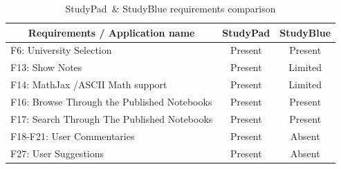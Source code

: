 \documentclass[thesis=B,english]{FITthesis}[2012/10/20]
\newcommand{\appname}{StudyPad}
\begin{document}
\begin{table}[H]
\caption{\appname\ \& StudyBlue requirements comparison}
\label{tab:studyblue}
\begin{tabular}{|l|c|c|}
\hline
\multicolumn{1}{|c|}{\textbf{Requirements / Application name}} & \multicolumn{1}{l|}{\textbf{StudyPad}} & \multicolumn{1}{l|}{\textbf{StudyBlue}} \\ \hline
F6: University Selection                                       & Present                                & Present                                \\ \hline
F13: Show Notes                                                & Present                                & Limited                                \\ \hline
F14: MathJax /ASCII Math support                               & Present                                & Limited                                \\ \hline
F16: Browse Through the Published Notebooks                        & Present                                & Present                               \\ \hline
F17: Search Through The Published Notebooks                    & Present                                & Present                               \\ \hline
F18-F21: User Commentaries                                     & Present                                & Absent                                \\ \hline
F27: User Suggestions                                          & Present                                & Absent                               \\ \hline
\end{tabular}
\end{table}
\end{document}
